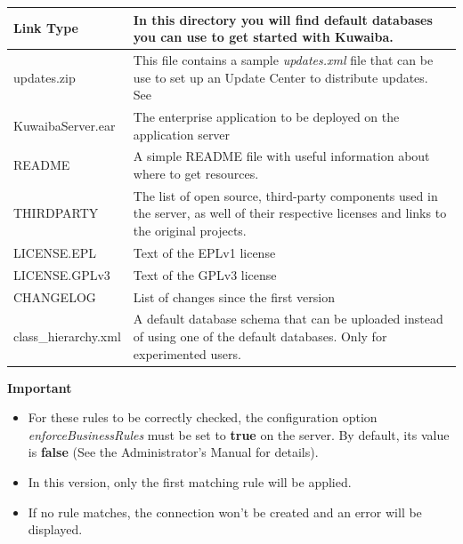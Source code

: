 \documentclass[a4paper]{article}
\begin{document}
\begin{appendices}
			\begin{table}[h!]
				\begin{tabular}{p{5cm}p{10cm}}
					\toprule
					Link Type & 
					In this directory you will find default databases you can use to get started with Kuwaiba. \\
					\midrule
					updates.zip & This file contains a sample \textit{updates.xml} file that can be use to set up an Update Center to distribute updates. See \textbf{\nameref{app:AppendixE}}\\
					\midrule
					KuwaibaServer.ear & The enterprise application to be deployed on the application server \\
					\midrule
					README & A simple README file with useful information about where to get resources. \\
					\midrule
					THIRDPARTY & The list of open source, third-party components used in the server, as well of their respective licenses and links to the original projects. \\
					\midrule
					LICENSE.EPL & Text of the EPLv1 license \\
					\midrule
					LICENSE.GPLv3 & Text of the GPLv3 license \\
					\midrule
					CHANGELOG & List of changes since the first version \\
					\midrule
					class\_hierarchy.xml & A default database schema that can be uploaded instead of using one of the default databases. Only for experimented users. \\
					\bottomrule	
				\end{tabular}
			\end{table}
			
			\begin{framed} {\large \textbf{Important}}
				\begin{itemize}
					\item For these rules to be correctly checked, the configuration option \textit{enforceBusinessRules} must be set to \textbf{true} on the server. By default, its value is \textbf{false} (See the Administrator's Manual for details).
					\item In this version, only the first matching rule will be applied.
					\item If no rule matches, the connection won't be created and an error will be displayed.
				\end{itemize}
			\end{framed}
			
		\end{appendices}				
\end{document}
